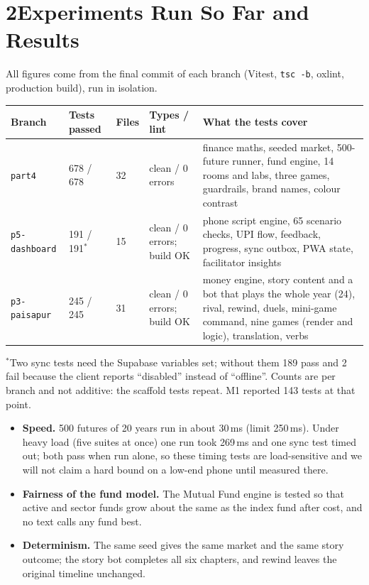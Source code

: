 \documentclass[10pt,a4paper]{article}
\begin{document}
\section*{2\quad Experiments Run So Far and Results}

All figures come from the final commit of each branch (Vitest, \texttt{tsc -b}, oxlint, production build), run in isolation.

\begin{center}\small
\begin{tabular}{@{}p{2.3cm}p{1.9cm}p{1.7cm}p{1.6cm}p{6.6cm}@{}}
\toprule
\textbf{Branch} & \textbf{Tests passed} & \textbf{Files} & \textbf{Types / lint} & \textbf{What the tests cover}\\
\midrule
\texttt{part4} & 678 / 678 & 32 & clean / 0 errors & finance maths, seeded market, 500-future runner, fund engine, 14 rooms and labs, three games, guardrails, brand names, colour contrast\\
\texttt{p5-dashboard} & 191 / 191$^{*}$ & 15 & clean / 0 errors; build OK & phone script engine, 65 scenario checks, UPI flow, feedback, progress, sync outbox, PWA state, facilitator insights\\
\texttt{p3-paisapur} & 245 / 245 & 31 & clean / 0 errors; build OK & money engine, story content and a bot that plays the whole year (24), rival, rewind, duels, mini-game command, nine games (render and logic), translation, verbs\\
\bottomrule
\end{tabular}
\end{center}
{\footnotesize $^{*}$Two sync tests need the Supabase variables set; without them 189 pass and 2 fail because the client reports ``disabled'' instead of ``offline''. Counts are per branch and not additive: the scaffold tests repeat. M1 reported 143 tests at that point.}

\begin{itemize}
  \item \textbf{Speed.} 500 futures of 20 years run in about 30\,ms (limit 250\,ms). Under heavy load (five suites at once) one run took 269\,ms and one sync test timed out; both pass when run alone, so these timing tests are load-sensitive and we will not claim a hard bound on a low-end phone until measured there.
  \item \textbf{Fairness of the fund model.} The Mutual Fund engine is tested so that active and sector funds grow about the same as the index fund after cost, and no text calls any fund best.
  \item \textbf{Determinism.} The same seed gives the same market and the same story outcome; the story bot completes all six chapters, and rewind leaves the original timeline unchanged.
\end{itemize}
\end{document}
